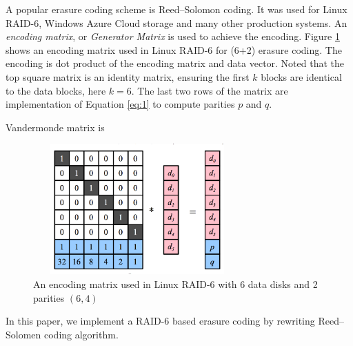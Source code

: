 A popular erasure coding scheme is Reed--Solomon coding. It was used for Linux RAID-6, Windows Azure Cloud storage and many other production systems. An \textit{encoding matrix}, or \textit{Generator Matrix} is used to achieve the encoding. Figure \ref{fig:encoding_matrix} shows an encoding matrix used in Linux RAID-6 for (6+2) erasure coding. The encoding is dot product of the encoding matrix and data vector. Noted that the top square matrix is an identity matrix, ensuring the first $k$ blocks are identical to the data blocks, here $k=6$. The last two rows of the matrix are implementation of Equation \ref{eq:1} to compute parities $p$ and $q$.

Vandermonde matrix is 


\begin{figure}[t]
	\includegraphics[width=8cm,height=5cm,angle=0]{encoding_matrix.png}
	\caption{An encoding matrix used in Linux RAID-6 with 6 data disks and 2 parities $(6,4)$ \cite{plank2013tutorial} }
	\label{fig:encoding_matrix}
\end{figure}


In this paper, we implement a RAID-6 based erasure coding by rewriting Reed--Solomen coding algorithm.
